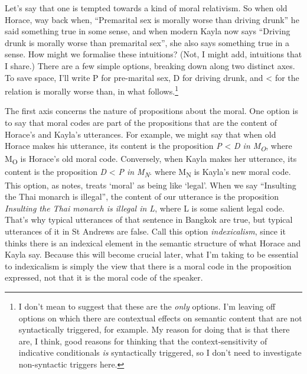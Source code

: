 Let's say that one is tempted towards a kind of moral relativism. So when old Horace, way back when, ``Premarital sex is morally worse than driving drunk'' he said something true in some sense, and when modern Kayla now says ``Driving drunk is morally worse than premarital sex'', she also says something true in a sense. How might we formalise these intuitions? (Not, I might add, intuitions that I share.) There are a few simple options, breaking down along two distinct axes. To save space, I'll write P for pre-marital sex, D for driving drunk, and {\textless} for the relation is morally worse than, in what follows.\footnote{ I don't mean to suggest that these are the \textit{only} options. I'm leaving off options on which there are contextual effects on semantic content that are not syntactically triggered, for example. My reason for doing that is that there are, I think, good reasons for thinking that the context-sensitivity of indicative conditionals \textit{is} syntactically triggered, so I don't need to investigate non-syntactic triggers here.}

The first axis concerns the nature of propositions about the moral. One option is to say that moral codes are part of the propositions that are the content of Horace's and Kayla's utterances. For example, we might say that when old Horace makes his utterance, its content is the proposition \textit{P }{\textless}\textit{ D in M}\textit{\textsubscript{O}}, where M\textsubscript{O} is Horace's old moral code. Conversely, when Kayla makes her utterance, its content is the proposition \textit{D }{\textless}\textit{ P in M}\textit{\textsubscript{N}}. where M\textsubscript{N} is Kayla's new moral code. This option, as \cite{SayreMcCord1991} notes, treats `moral' as being like `legal'. When we say ``Insulting the Thai monarch is illegal'', the content of our utterance is the proposition \textit{Insulting the Thai monarch is illegal in L}, where L is some salient legal code. That's why typical utterances of that sentence in Bangkok are true, but typical utterances of it in St Andrews are false. Call this option \textit{indexicalism}, since it thinks there is an indexical element in the semantic structure of what Horace and Kayla say. Because this will become crucial later, what I'm taking to be essential to indexicalism is simply the view that there is a moral code in the proposition expressed, not that it is the moral code of the speaker.

